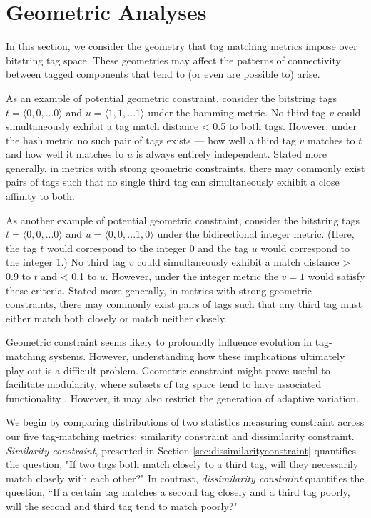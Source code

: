 \section{Geometric Analyses} \label{sec:geometric}

In this section, we consider the geometry that tag matching metrics impose over bitstring tag space.
These geometries may affect the patterns of connectivity between tagged components that tend to (or even are possible to) arise.

As an example of potential geometric constraint, consider the bitstring tags $t = \langle 0, 0, ... 0 \rangle$ and $u = \langle 1, 1, ... 1 \rangle$ under the hamming metric.
No third tag $v$ could simultaneously exhibit a tag match distance < 0.5 to both tags.
However, under the hash metric no such pair of tags exists --- how well a third tag $v$ matches to $t$ and how well it matches to $u$ is always entirely independent.
Stated more generally, in metrics with strong geometric constraints, there may commonly exist pairs of tags such that no single third tag can simultaneously exhibit a close affinity to both.

As another example of potential geometric constraint, consider the bitstring tags $t = \langle 0, 0, ... 0 \rangle$ and $u = \langle 0, 0, ... 1 , 0 \rangle$ under the bidirectional integer metric.
(Here, the tag $t$ would correspond to the integer 0 and the tag $u$ would correspond to the integer 1.)
No third tag $v$ could simultaneously exhibit a match distance > 0.9 to $t$ and < 0.1 to $u$.
However, under the integer metric the $v = 1$ would satisfy these criteria.
Stated more generally, in metrics with strong geometric constraints, there may commonly exist pairs of tags such that any third tag must either match both closely or match neither closely.

Geometric constraint seems likely to profoundly influence evolution in tag-matching systems.
However, understanding how these implications ultimately play out is a difficult problem.
Geometric constraint might prove useful to facilitate modularity, where subsets of tag space tend to have associated functionality \citep{holland1990concerning}.
However, it may also restrict the generation of adaptive variation.

We begin by comparing distributions of two statistics measuring constraint across our five tag-matching metrics: similarity constraint and dissimilarity constraint.
\textit{Similarity constraint}, presented in Section \ref{sec:dissimilarityconstraint} quantifies the question, "If two tags both match closely to a third tag, will they necessarily match closely with each other?"
In contrast, \textit{dissimilarity constraint} quantifies the question, ``If a certain tag matches a second tag closely and a third tag poorly, will the second and third tag tend to match poorly?"

